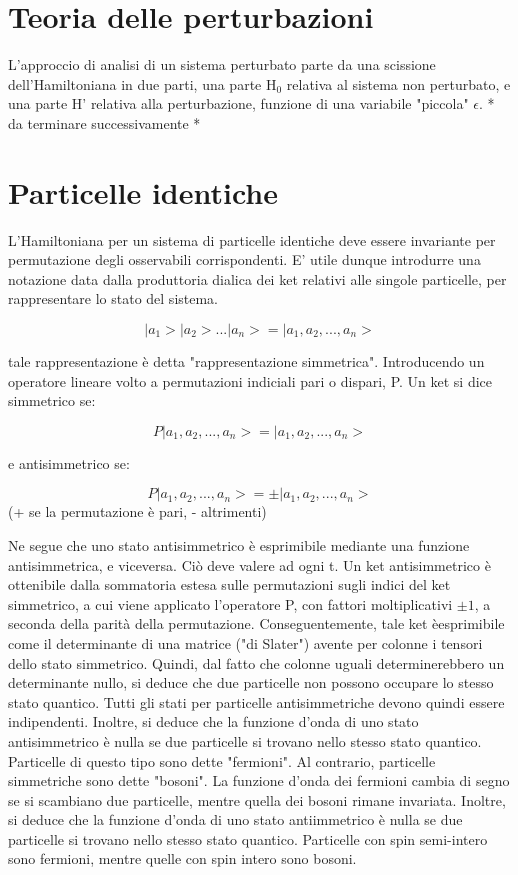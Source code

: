 \documentclass{article}
\begin{document}
\section{Teoria delle perturbazioni}
L'approccio di analisi di un sistema perturbato parte da una scissione dell'Hamiltoniana in due parti, una parte H$_0$ relativa al sistema non perturbato, e una parte H' relativa alla perturbazione, funzione di una variabile "piccola" $\epsilon$.
* da terminare successivamente *

\section{Particelle identiche}
L'Hamiltoniana per un sistema di particelle identiche deve essere invariante per permutazione degli osservabili corrispondenti.
E' utile dunque introdurre una notazione data dalla produttoria dialica dei ket relativi alle singole particelle, per rappresentare lo stato del sistema.

\begin{equation}
    |a_1>|a_2>...|a_n>=|a_1,a_2,...,a_n>
\end{equation}

tale rappresentazione è detta "rappresentazione simmetrica".
Introducendo un operatore lineare volto a permutazioni indiciali pari o dispari, P.
Un ket si dice simmetrico se:

\begin{equation}
    P|a_1,a_2,...,a_n>=|a_1,a_2,...,a_n>
\end{equation}

e antisimmetrico se:

\begin{equation}
    P|a_1,a_2,...,a_n>=\pm|a_1,a_2,...,a_n>
\end{equation}
(+ se la permutazione è pari, - altrimenti)

Ne segue che uno stato antisimmetrico è esprimibile mediante una funzione antisimmetrica, e viceversa.
Ciò deve valere ad ogni t.
Un ket antisimmetrico è ottenibile dalla sommatoria estesa sulle permutazioni sugli indici del ket simmetrico, a cui viene applicato l'operatore P, con fattori moltiplicativi $\pm 1$, a
seconda della parità della permutazione.
Conseguentemente, tale ket èesprimibile come il determinante di una matrice ("di Slater") avente per colonne i tensori dello stato simmetrico.
Quindi, dal fatto che colonne uguali determinerebbero un determinante nullo, si deduce che due particelle non possono occupare lo stesso stato quantico.
Tutti gli stati per particelle antisimmetriche devono quindi essere indipendenti.
Inoltre, si deduce che la funzione d'onda di uno stato antisimmetrico è nulla se due particelle si trovano nello stesso stato quantico.
Particelle di questo tipo sono dette "fermioni".
Al contrario, particelle simmetriche sono dette "bosoni".
La funzione d'onda dei fermioni cambia di segno se si scambiano due particelle, mentre quella dei bosoni rimane invariata.
Inoltre, si deduce che la funzione d'onda di uno stato antiimmetrico è nulla se due particelle si trovano nello stesso stato quantico.
Particelle con spin semi-intero sono fermioni, mentre quelle con spin intero sono bosoni.
\end{document}
